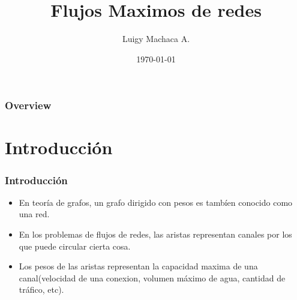 \documentclass{beamer}
\title[Fujos Maximos]{Flujos Maximos de redes} %
\author{Luigy Machaca A.} %
\institute[Ciencia de la computaci\'on] %
{
Universidad Nacional de San Agustin \\ %
\medskip
\textit{luigy.mach.arc@gmail.com} %
}
\date{\today} %
\begin{document}
\begin{frame}
\titlepage %
\end{frame}

\begin{frame}
\frametitle{Overview} %
\tableofcontents %
\end{frame}



\section{Introducci\'on}

  \begin{frame}
      \frametitle{Introducci\'on}
      \begin{itemize}
	\item  En teor\'ia de grafos, un grafo dirigido con pesos es tamb\'ien conocido como una red.
	\item En los problemas de flujos de redes, las aristas representan canales por los que puede circular cierta cosa.
	\item Los pesos de las aristas representan la capacidad maxima de una canal(velocidad de una conexion, volumen m\'aximo de agua, cantidad de tr\'afico, etc).
      \end{itemize}
      \end{frame}
     
\end{document}
